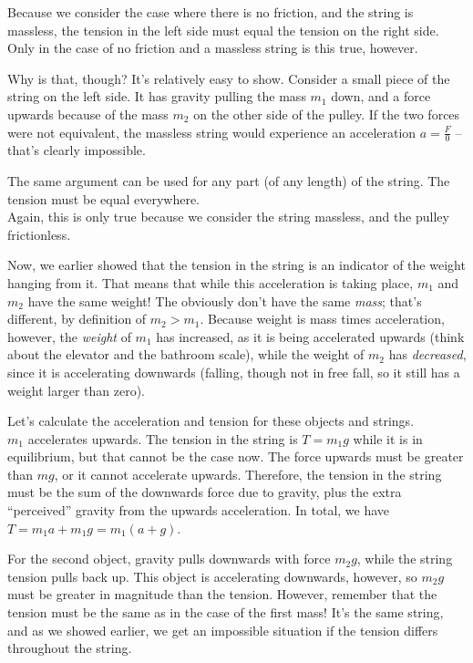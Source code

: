Because we consider the case where there is no friction, and the string is massless, the tension in the left side must equal the tension on the right side. Only in the case of no friction and a massless string is this true, however.

Why is that, though? It's relatively easy to show. Consider a small piece of the string on the left side. It has gravity pulling the mass $m_1$ down, and a force upwards because of the mass $m_2$ on the other side of the pulley. If the two forces were not equivalent, the massless string would experience an acceleration $a = \frac{F}{0}$ -- that's clearly impossible.	

The same argument can be used for any part (of any length) of the string. The tension must be equal everywhere.\\
Again, this is only true because we consider the string massless, and the pulley frictionless.

Now, we earlier showed that the tension in the string is an indicator of the weight hanging from it. That means that while this acceleration is taking place, $m_1$ and $m_2$ have the same weight! The obviously don't have the same \emph{mass}; that's different, by definition of $m_2 > m_1$. Because weight is mass times acceleration, however, the \emph{weight} of $m_1$ has increased, as it is being accelerated upwards (think about the elevator and the bathroom scale), while the weight of $m_2$ has \emph{decreased}, since it is accelerating downwards (falling, though not in free fall, so it still has a weight larger than zero).

Let's calculate the acceleration and tension for these objects and strings.\\
$m_1$ accelerates upwards. The tension in the string is $T = m_1 g$ while it is in equilibrium, but that cannot be the case now. The force upwards must be greater than $m g$, or it cannot accelerate upwards. Therefore, the tension in the string must be the sum of the downwards force due to gravity, plus the extra ``perceived'' gravity from the upwards acceleration. In total, we have $T = m_1 a + m_1 g = m_1(a + g)$.

For the second object, gravity pulls downwards with force $m_2 g$, while the string tension pulls back up. This object is accelerating downwards, however, so $m_2 g$ must be greater in magnitude than the tension. However, remember that the tension must be the same as in the case of the first mass! It's the same string, and as we showed earlier, we get an impossible situation if the tension differs throughout the string.

